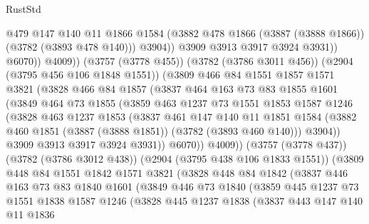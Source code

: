 \begin{lexlean}{RustStd}
\begin{coremodule}
                        @479
                        @147
                        @140
                        @11
                        @1866
                        @1584
                        (@3882 @478 @1866 (@3887 (@3888 @1866)) (@3782 (@3893 @478 @140)))
                        @3904))
                    @3909
                    @3913
                    @3917
                    @3924
                    @3931))
                @6070))
            @4009))
        (@3757 (@3778 @455))
        (@3782 (@3786 @3011 @456))
        (@2904 (@3795 @456 @106 @1848 @1551))
        (@3809
          @466
          @84
          @1551
          @1857
          @1571
          @3821
          (@3828
            @466
            @84
            @1857
            (@3837
              @464
              @163
              @73
              @83
              @1855
              @1601
              (@3849
                @464
                @73
                @1855
                (@3859
                  @463
                  @1237
                  @73
                  @1551
                  @1853
                  @1587
                  @1246
                  (@3828
                    @463
                    @1237
                    @1853
                    (@3837
                      @461
                      @147
                      @140
                      @11
                      @1851
                      @1584
                      (@3882 @460 @1851 (@3887 (@3888 @1851)) (@3782 (@3893 @460 @140)))
                      @3904))
                  @3909
                  @3913
                  @3917
                  @3924
                  @3931))
              @6070))
          @4009))
      (@3757 (@3778 @437))
      (@3782 (@3786 @3012 @438))
      (@2904 (@3795 @438 @106 @1833 @1551))
      (@3809
        @448
        @84
        @1551
        @1842
        @1571
        @3821
        (@3828
          @448
          @84
          @1842
          (@3837
            @446
            @163
            @73
            @83
            @1840
            @1601
            (@3849
              @446
              @73
              @1840
              (@3859
                @445
                @1237
                @73
                @1551
                @1838
                @1587
                @1246
                (@3828
                  @445
                  @1237
                  @1838
                  (@3837
                    @443
                    @147
                    @140
                    @11
                    @1836

\end{coremodule}
\end{lexlean}

